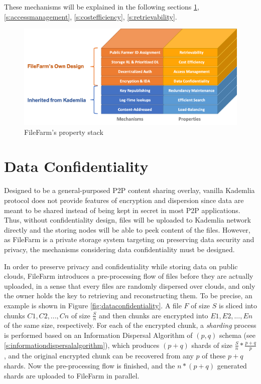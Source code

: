 \noindent These mechanisms will be explained in the following sections \ref{s:dataconfidentiality}, \ref{s:accessmanagement}, \ref{s:costefficiency}, \ref{s:retrievability}.

\begin{figure}[hbt]
\centering
  \includegraphics[width=14cm]{figures/property_stack.png}
  \caption{FileFarm's property stack}
  \label{fig:propertystack}
\end{figure}

\section{Data Confidentiality}
\label{s:dataconfidentiality}

Designed to be a general-purposed P2P content sharing overlay, vanilla Kademlia protocol does not provide features of encryption and dispersion since data are meant to be shared instead of being kept in secret in most P2P applications. Thus, without confidentiality design, files will be uploaded to Kademlia network directly and the storing nodes will be able to peek content of the files. However, as FileFarm is a private storage system targeting on preserving data security and privacy, the mechanisms considering data confidentiality must be designed.

In order to preserve privacy and confidentiality while storing data on public clouds, FileFarm introduces a pre-processing flow of files before they are actually uploaded, in a sense that every files are randomly dispersed over clouds, and only the owner holds the key to retrieving and reconstructing them. To be precise, an example is shown in Figure \ref{fig:dataconfidentiality}. A file $F$ of size $S$ is sliced into chunks $C1, C2, ..., Cn$ of size $\frac{S}{n}$ and then chunks are encrypted into $E1, E2, ..., En$ of the same size, respectively. For each of the encrypted chunk, a \textit{sharding} process is performed based on an Information Dispersal Algorithm of $(p,q)$ schema (see \ref{s:informationdispersalalgorithm}), which produces $(p + q)$ shards of size $\frac{S}{n}*\frac{p+q}{p}$, and the original encrypted chunk can be recovered from any $p$ of these $p + q$ shards. Now the pre-processing flow is finished, and the $n * (p + q)$ generated shards are uploaded to FileFarm in parallel.

